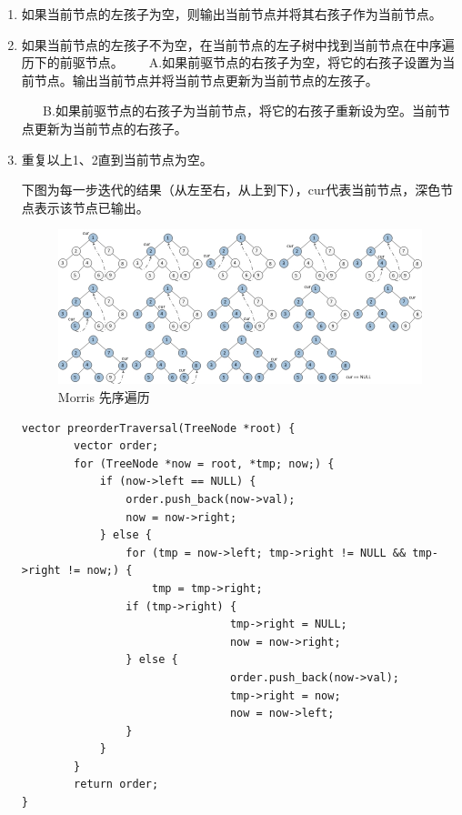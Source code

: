 \documentclass[12pt]{book}
\begin{document}
\begin{enumerate}
\item 如果当前节点的左孩子为空，则输出当前节点并将其右孩子作为当前节点。
\label{sec-4-1-2-1}
\item 如果当前节点的左孩子不为空，在当前节点的左子树中找到当前节点在中序遍历下的前驱节点。
\label{sec-4-1-2-2}
~ ~ A.如果前驱节点的右孩子为空，将它的右孩子设置为当前节点。输出当前节点并将当前节点更新为当前节点的左孩子。

~ ~ B.如果前驱节点的右孩子为当前节点，将它的右孩子重新设为空。当前节点更新为当前节点的右孩子。
\item 重复以上1、2直到当前节点为空。
\label{sec-4-1-2-3}

下图为每一步迭代的结果（从左至右，从上到下），cur代表当前节点，深色节
点表示该节点已输出。

\begin{figure}[htb]
\centering
\includegraphics[width=.9\linewidth]{./pic/morrPre.jpg}
\caption{Morris 先序遍历}
\end{figure}

\lstset{language=java,label= ,caption= ,numbers=none}
\begin{lstlisting}
vector preorderTraversal(TreeNode *root) {
        vector order;
        for (TreeNode *now = root, *tmp; now;) {
            if (now->left == NULL) {
                order.push_back(now->val);
                now = now->right;   
            } else {
                for (tmp = now->left; tmp->right != NULL && tmp->right != now;) {
                    tmp = tmp->right;
                if (tmp->right) {
                                tmp->right = NULL;
                                now = now->right;
                } else {
                                order.push_back(now->val);
                                tmp->right = now;
                                now = now->left;
                }
            }
        }
        return order;
}
\end{lstlisting}
\end{enumerate}
\end{document}
